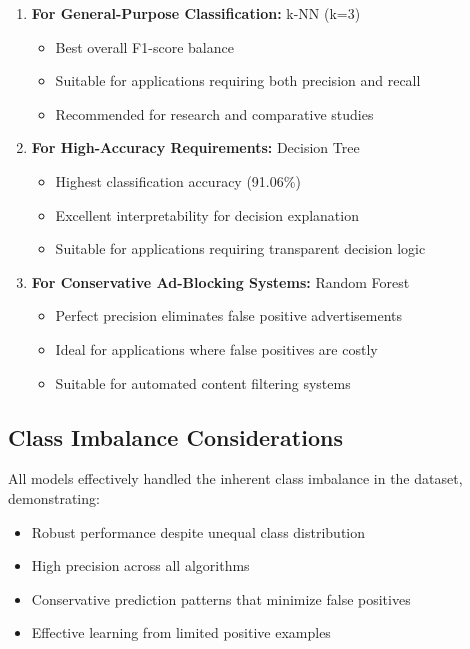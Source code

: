 \begin{enumerate}
    \item \textbf{For General-Purpose Classification:} k-NN (k=3)
    \begin{itemize}
        \item Best overall F1-score balance
        \item Suitable for applications requiring both precision and recall
        \item Recommended for research and comparative studies
    \end{itemize}
    
    \item \textbf{For High-Accuracy Requirements:} Decision Tree
    \begin{itemize}
        \item Highest classification accuracy (91.06\%)
        \item Excellent interpretability for decision explanation
        \item Suitable for applications requiring transparent decision logic
    \end{itemize}
    
    \item \textbf{For Conservative Ad-Blocking Systems:} Random Forest
    \begin{itemize}
        \item Perfect precision eliminates false positive advertisements
        \item Ideal for applications where false positives are costly
        \item Suitable for automated content filtering systems
    \end{itemize}
\end{enumerate}

\subsection{Class Imbalance Considerations}

All models effectively handled the inherent class imbalance in the dataset, demonstrating:
\begin{itemize}
    \item Robust performance despite unequal class distribution
    \item High precision across all algorithms
    \item Conservative prediction patterns that minimize false positives
    \item Effective learning from limited positive examples
\end{itemize}

